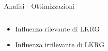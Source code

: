 \documentclass[12pt]{beamer}
\begin{document}
  \begin{frame}[fragile]{Analisi - Ottimizzazioni}
    \begin{columns}
    		\begin{column}{0.4\textwidth}
    			\begin{itemize}
    				\item<1> Influenza rilevante di LKRG
    				\item<2> Influenza irrilevante di LKRG
    			\end{itemize}
    		\end{column}
    		\begin{column}{0.7\textwidth}
        \begin{overprint}
        \begin{center}
          \end{center}
          \end{overprint}
    		\end{column}
    	\end{columns}
  \end{frame}
\end{document}
